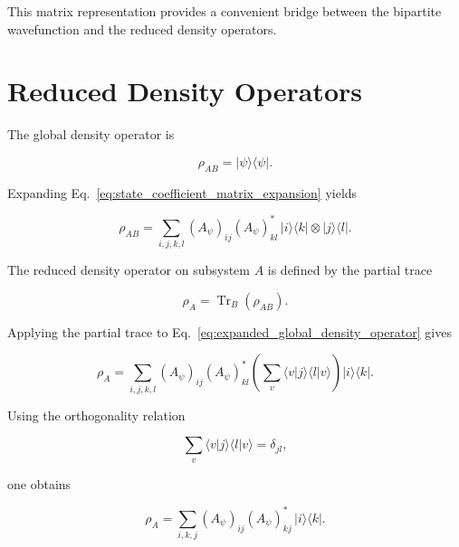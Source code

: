 This matrix representation provides a convenient bridge between the bipartite wavefunction and the reduced density operators.


\section*{Reduced Density Operators}

The global density operator is

\begin{equation}
\rho_{AB}
=
|\psi\rangle\langle\psi|.
\label{eq:global_density_operator_appendix}
\end{equation}

Expanding Eq.~\eqref{eq:state_coefficient_matrix_expansion} yields

\begin{equation}
\rho_{AB}
=
\sum_{i,j,k,l}
(A_\psi)_{ij}
(A_\psi)^*_{kl}
\,
|i\rangle\langle k|
\otimes
|j\rangle\langle l|.
\label{eq:expanded_global_density_operator}
\end{equation}

The reduced density operator on subsystem \(A\) is defined by the partial trace

\begin{equation}
\rho_A
=
\operatorname{Tr}_B(\rho_{AB}).
\label{eq:partial_trace_appendix}
\end{equation}

Applying the partial trace to Eq.~\eqref{eq:expanded_global_density_operator} gives

\begin{equation}
\rho_A
=
\sum_{i,j,k,l}
(A_\psi)_{ij}
(A_\psi)^*_{kl}
\left(
\sum_v
\langle v|j\rangle
\langle l|v\rangle
\right)
|i\rangle\langle k|.
\label{eq:partial_trace_expansion}
\end{equation}

Using the orthogonality relation

\begin{equation}
\sum_v
\langle v|j\rangle
\langle l|v\rangle
=
\delta_{jl},
\label{eq:orthogonality_relation_appendix}
\end{equation}

one obtains

\begin{equation}
\rho_A
=
\sum_{i,k,j}
(A_\psi)_{ij}
(A_\psi)^*_{kj}
\,|i\rangle\langle k|.
\label{eq:reduced_density_operator_expanded}
\end{equation}

